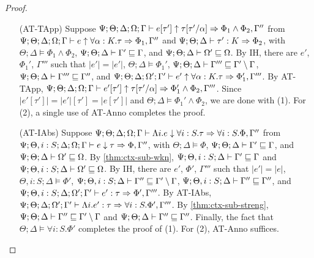 \begin{proof}
\begin{itemize}
  \item[(AT-TApp)] Suppose $\Psi ; \Theta ; \Delta ; \Omega ; \Gamma \vdash e [\tau'] \uparrow \tau[\tau'/\alpha] \Rightarrow \Phi_1 \wedge \Phi_2, \Gamma''$ from
  $\Psi ; \Theta ; \Delta ; \Omega ; \Gamma \vdash e \uparrow \forall \alpha : K.\tau \Rightarrow \Phi_1, \Gamma''$ and
  $\Psi ; \Theta ; \Delta \vdash \tau' : K \Rightarrow \Phi_2$, with
  $\Theta ; \Delta \vDash \Phi_1 \wedge \Phi_2$,
  $\Psi ; \Theta ; \Delta \vdash \Gamma' \sqsubseteq \Gamma$, and
  $\Psi ; \Theta ; \Delta \vdash \Omega' \sqsubseteq \Omega$.
  By IH, there are $e'$, $\Phi_1'$, $\Gamma'''$ such that 
  $|e'| = |e'|$,
  $\Theta ; \Delta \vDash \Phi_1'$,
  $\Psi ; \Theta ; \Delta \vdash \Gamma''' \sqsubseteq \Gamma' \setminus \Gamma$,
  $\Psi ; \Theta ; \Delta \vdash \Gamma''' \sqsubseteq \Gamma''$, and
  $\Psi ; \Theta ; \Delta ; \Omega' ; \Gamma' \vdash e' \uparrow \forall \alpha : K.\tau \Rightarrow \Phi_1', \Gamma'''$.
  By AT-TApp,
  $\Psi ; \Theta ; \Delta ; \Omega ; \Gamma \vdash e' [\tau'] \uparrow \tau[\tau'/\alpha] \Rightarrow \Phi_1' \wedge \Phi_2, \Gamma'''$.
  Since $|e' [\tau']| = |e'| [\tau'] = |e [\tau']|$ and $\Theta ; \Delta \vDash \Phi_1' \wedge \Phi_2$, we are done with (1).
  For (2), a single use of AT-Anno completes the proof.
  
  \item[(AT-IAbs)] Suppose $\Psi ; \Theta ; \Delta ; \Omega ; \Gamma \vdash \Lambda i. e \downarrow \forall i : S. \tau \Rightarrow \forall i : S. \Phi, \Gamma''$
  from $\Psi ; \Theta, i : S ; \Delta ; \Omega ; \Gamma \vdash e \downarrow \tau \Rightarrow \Phi, \Gamma''$, with
  $\Theta ; \Delta \vDash \Phi$,
  $\Psi ; \Theta ; \Delta \vdash \Gamma' \sqsubseteq \Gamma$, and
  $\Psi ; \Theta ; \Delta \vdash \Omega' \sqsubseteq \Omega$.
  By \autoref{thm:ctx-sub-wkn},
  $\Psi ; \Theta, i : S ; \Delta \vdash \Gamma' \sqsubseteq \Gamma$ and
  $\Psi ; \Theta, i : S ; \Delta \vdash \Omega' \sqsubseteq \Omega$.
  By IH, there are $e'$, $\Phi'$, $\Gamma'''$ such that
  $|e'| = |e|$,
  $\Theta, i : S; \Delta \vDash \Phi'$,
  $\Psi ; \Theta, i : S ; \Delta \vdash \Gamma'' \sqsubseteq \Gamma' \setminus \Gamma$,
  $\Psi ; \Theta, i : S ; \Delta \vdash \Gamma'' \sqsubseteq \Gamma''$, and
  $\Psi ; \Theta, i : S ; \Delta ; \Omega' ; \Gamma' \vdash e' : \tau \Rightarrow \Phi', \Gamma'''$.
  By AT-IAbs,
  $\Psi ; \Theta ; \Delta ; \Omega' ; \Gamma' \vdash \Lambda i. e' : \tau \Rightarrow \forall i : S. \Phi', \Gamma'''$.
  By \autoref{thm:ctx-sub-streng},
  $\Psi ; \Theta ; \Delta \vdash \Gamma'' \sqsubseteq \Gamma' \setminus \Gamma$ and
  $\Psi ; \Theta ; \Delta \vdash \Gamma'' \sqsubseteq \Gamma''$.
  Finally, the fact that $\Theta ; \Delta \vDash \forall i : S. \Phi'$
  completes the proof of (1).
  For (2), AT-Anno suffices.
  

\end{itemize}
\end{proof}
